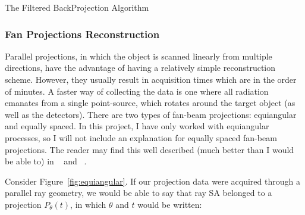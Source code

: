 \begin{algorithm}
    \caption{The Filtered BackProjection Algorithm}
    \label{alg:fbp}
    \SetAlgoLined
    
\end{algorithm}



\subsubsection{Fan Projections Reconstruction}%
\label{ssub:fan_projections_reconstruction}

Parallel projections, in which the object is scanned linearly from
multiple directions, have the advantage of having a relatively simple
reconstruction scheme. However, they usually result in acquisition times
which are in the order of minutes. A faster way of collecting the data
is one where all radiation emanates from a single point-source, which
rotates around the target object (as well as the detectors). There are
two types of fan-beam projections: equiangular and equally spaced. In
this project, I have only worked with equiangular processes, so I will
not include an explanation for equally spaced fan-beam projections. The
reader may find this well described (much better than I would be able
to) in ~\cite{Kak2001} and ~\cite{Herman1973}.

Consider Figure~\ref{fig:equiangular}. If our projection data were
acquired through a parallel ray geometry, we would be able to say that
ray SA belonged to a projection $P_{\theta}(t)$, in which $\theta$ and
$t$ would be written:

